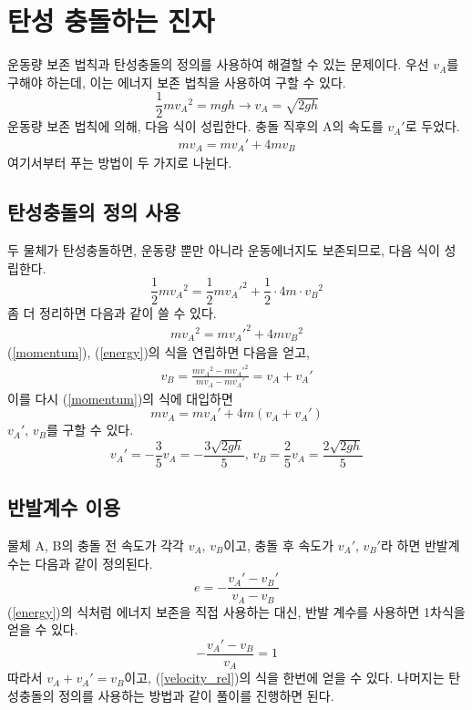 \documentclass{scrartcl}
\title{\doctitle}
\author{Project Eclipse (손량)}
\date{Last compiled on: \today, \currenttime}
\begin{document}
\maketitle

\section{탄성 충돌하는 진자}
운동량 보존 법칙과 탄성충돌의 정의를 사용하여 해결할 수 있는 문제이다. 우선 \(v_A\)를 구해야 하는데, 이는 에너지 보존 법칙을 사용하여 구할 수 있다.
\[\frac{1}{2}m{v_A}^2=mgh\longrightarrow v_A=\sqrt{2gh}\]
운동량 보존 법칙에 의해, 다음 식이 성립한다. 충돌 직후의 A의 속도를 \({v_A}'\)로 두었다.
\begin{align}\label{momentum}mv_A=m{v_A}'+4mv_B\end{align}
여기서부터 푸는 방법이 두 가지로 나뉜다.

\subsection{탄성충돌의 정의 사용}
두 물체가 탄성충돌하면, 운동량 뿐만 아니라 운동에너지도 보존되므로, 다음 식이 성립한다.
\[\frac{1}{2}m{v_A}^2=\frac{1}{2}m{{v_A}'}^2+\frac{1}{2}\cdot 4m\cdot{v_B}^2\]
좀 더 정리하면 다음과 같이 쓸 수 있다.
\begin{align}\label{energy}m{v_A}^2=m{{v_A}'}^2+4m{v_B}^2\end{align}
(\ref{momentum}), (\ref{energy})의 식을 연립하면 다음을 얻고,
\begin{align}\label{velocity_rel}v_B=\frac{m{v_A}^2-m{{v_A}'}^2}{mv_A-m{v_A}'}=v_A+{v_A}'\end{align}
이를 다시 (\ref{momentum})의 식에 대입하면
\[mv_A=m{v_A}'+4m(v_A+{v_A}')\]
\({v_A}',\,v_B\)를 구할 수 있다.
\[{v_A}'=-\frac{3}{5}v_A=-\frac{3\sqrt{2gh}}{5},\,v_B=\frac{2}{5}v_A=\frac{2\sqrt{2gh}}{5}\]

\subsection{반발계수 이용}
물체 A, B의 충돌 전 속도가 각각 \(v_A,\,v_B\)이고, 충돌 후 속도가 \({v_A}',\,{v_B}'\)라 하면 반발계수는 다음과 같이 정의된다.
\[e=-\frac{{v_A}'-{v_B}'}{v_A-v_B}\]
(\ref{energy})의 식처럼 에너지 보존을 직접 사용하는 대신, 반발 계수를 사용하면 1차식을 얻을 수 있다.
\[-\frac{{v_A}'-v_B}{v_A}=1\]
따라서 \(v_A+{v_A}'=v_B\)이고, (\ref{velocity_rel})의 식을 한번에 얻을 수 있다. 나머지는 탄성충돌의 정의를 사용하는 방법과 같이 풀이를 진행하면 된다.
\end{document}
